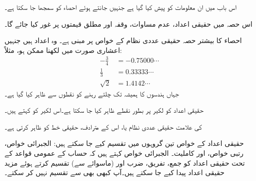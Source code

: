 
اس باب میں ان معلومات کو پیش کیا گیا ہے جنہیں جانتے ہوئے احصاء کو سمجھا جا سکتا ہے۔

اس حصہ میں حقیقی اعداد، عدم مساوات، وقفہ اور مطلق قیمتوں پر غور کیا جائے گا۔

احصاء کا بیشتر حصہ حقیقی عددی نظام کے خواص پر مبنی ہے۔ وہ اعداد ہیں جنہیں اعشاری صورت میں لکھنا ممکن ہو، مثلاً:
\begin{align*}
-\frac{3}{4}&=-0.75000\cdots\\
\frac{1}{3}&=0.33333\cdots\\
\sqrt{2}&=1.4142\cdots
\end{align*}
جہاں ہندسوں کا  ہمیشہ تک چلتے رہنے کو نقطوں  سے ظاہر کیا گیا ہے۔

حقیقی اعداد کو لکیر پر بطور نقطے ظاہر کیا جا سکتا ہے۔اس لکیر کو  کہتے ہیں۔
\begin{center}
\end{center}
 کی علامت حقیقی عددی نظام یا، اس کے مترادف، حقیقی خط کو ظاہر کرتی ہے۔

حقیقی اعداد کے خواص تین گروہوں میں تقسیم کیے جا سکتے ہیں: الجبرائی خواص، رتبی خواص، اور کاملیت۔ الجبرائی خواص کہتے ہیں کہ حساب کے عمومی قواعد کے تحت حقیقی اعداد کو جمع، تفریق، ضرب اور (ماسوائے  سے) تقسیم   کرتے ہوئے مزید حقیقی اعداد پیدا کیے جا سکتے ہیں۔آپ کبھی بھی  سے تقسیم نہیں کر سکتے۔

